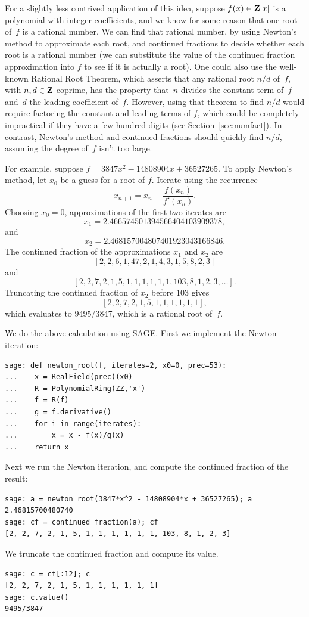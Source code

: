 For a slightly less contrived application of this idea, suppose
$f(x)\in\mathbf{Z}[x]$ is a polynomial with integer coefficients, and we know
for some reason that one root of~$f$ is a rational number.  We
can find that rational number, by using Newton's method to approximate
each root, and continued fractions to decide whether each root is a
rational number (we can substitute the value of the continued fraction
approximation into $f$ to see if it is actually a root).  One could
also use the well-known Rational Root Theorem, which asserts that any
rational root $n/d$ of~$f$, with $n,d\in\mathbf{Z}$ coprime, has the property
that~$n$ divides the constant term of~$f$ and~$d$ the leading
coefficient of~$f$.  However, using that theorem to find $n/d$ would
require factoring the constant and leading terms of $f$, which could
be completely impractical if they have a few hundred digits
(see Section~\ref{sec:numfact}).  In contrast, Newton's method and continued
fractions should quickly find $n/d$, assuming the degree of~$f$ isn't
too large.

For example, suppose $f=3847x^2 - 14808904x + 36527265$.  To apply
Newton's method, let $x_0$ be a guess for a root of $f$.  Iterate
using the recurrence
$$
 x_{n+1} = x_n - \frac{f(x_n)}{f'(x_n)}.
$$
Choosing $x_0 = 0$, approximations of the first two iterates are
$$
x_1 = 2.466574501394566404103909378,
$$
and
$$
x_2 = 2.468157004807401923043166846.
$$
The continued fraction of the approximations $x_1$ and $x_2$ are
$$
 [2, 2, 6, 1, 47, 2, 1, 4, 3, 1, 5, 8, 2, 3]
$$
and
$$
 [2, 2, 7, 2, 1, 5, 1, 1, 1, 1, 1, 1, 103, 8, 1, 2, 3, \ldots].
$$
Truncating the continued fraction of $x_2$ before $103$ gives $$[2, 2,
7, 2, 1, 5, 1, 1, 1, 1, 1, 1],$$ which evaluates to $9495/3847$, which
is a rational root of~$f$.

\begin{sg}
We do the above calculation using SAGE.  First we implement
the Newton iteration:
\begin{verbatim}
sage: def newton_root(f, iterates=2, x0=0, prec=53):
...    x = RealField(prec)(x0)
...    R = PolynomialRing(ZZ,'x')
...    f = R(f)
...    g = f.derivative()
...    for i in range(iterates):
...        x = x - f(x)/g(x)
...    return x
\end{verbatim}%

\par\noindent{}Next we run the Newton iteration, and compute
the continued fraction of the result:
\begin{verbatim}
sage: a = newton_root(3847*x^2 - 14808904*x + 36527265); a
2.46815700480740
sage: cf = continued_fraction(a); cf
[2, 2, 7, 2, 1, 5, 1, 1, 1, 1, 1, 1, 103, 8, 1, 2, 3]
\end{verbatim}%

\par\noindent{}We truncate the continued fraction and compute
its value.
\begin{verbatim}
sage: c = cf[:12]; c
[2, 2, 7, 2, 1, 5, 1, 1, 1, 1, 1, 1]
sage: c.value()
9495/3847
\end{verbatim}
\end{sg}

